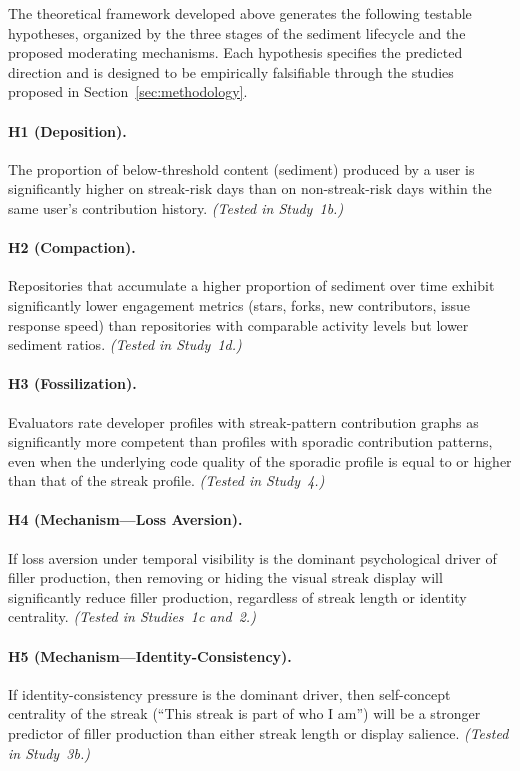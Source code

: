 \documentclass[12pt]{article}
\begin{document}
The theoretical framework developed above generates the following testable hypotheses, organized by the three stages of the sediment lifecycle and the proposed moderating mechanisms. Each hypothesis specifies the predicted direction and is designed to be empirically falsifiable through the studies proposed in Section~\ref{sec:methodology}.

\paragraph{H1 (Deposition).} The proportion of below-threshold content (sediment) produced by a user is significantly higher on streak-risk days than on non-streak-risk days within the same user's contribution history. \textit{(Tested in Study~1b.)}

\paragraph{H2 (Compaction).} Repositories that accumulate a higher proportion of sediment over time exhibit significantly lower engagement metrics (stars, forks, new contributors, issue response speed) than repositories with comparable activity levels but lower sediment ratios. \textit{(Tested in Study~1d.)}

\paragraph{H3 (Fossilization).} Evaluators rate developer profiles with streak-pattern contribution graphs as significantly more competent than profiles with sporadic contribution patterns, even when the underlying code quality of the sporadic profile is equal to or higher than that of the streak profile. \textit{(Tested in Study~4.)}

\paragraph{H4 (Mechanism---Loss Aversion).} If loss aversion under temporal visibility is the dominant psychological driver of filler production, then removing or hiding the visual streak display will significantly reduce filler production, regardless of streak length or identity centrality. \textit{(Tested in Studies~1c and~2.)}

\paragraph{H5 (Mechanism---Identity-Consistency).} If identity-consistency pressure is the dominant driver, then self-concept centrality of the streak (``This streak is part of who I am'') will be a stronger predictor of filler production than either streak length or display salience. \textit{(Tested in Study~3b.)}
\end{document}

